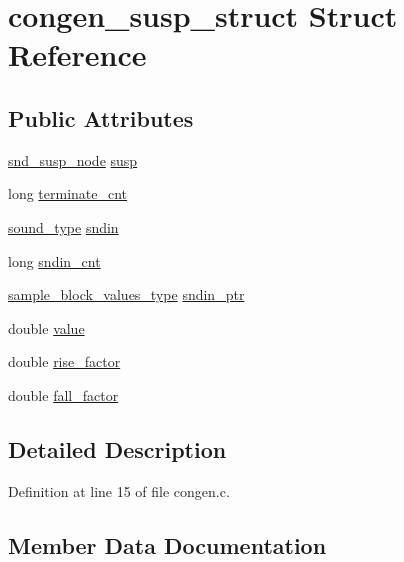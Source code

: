 \hypertarget{structcongen__susp__struct}{}\section{congen\+\_\+susp\+\_\+struct Struct Reference}
\label{structcongen__susp__struct}
\subsection*{Public Attributes}
\begin{DoxyCompactItemize}
\item 
\hyperlink{sound_8h_a6b268203688a934bd798ceb55f85d4c0}{snd\+\_\+susp\+\_\+node} \hyperlink{structcongen__susp__struct_a7e68a3f2f7cfc04521c251e8aa63b473}{susp}
\item 
long \hyperlink{structcongen__susp__struct_a2befa070198694684a16cc5afec63709}{terminate\+\_\+cnt}
\item 
\hyperlink{sound_8h_a792cec4ed9d6d636d342d9365ba265ea}{sound\+\_\+type} \hyperlink{structcongen__susp__struct_ad8e9b41cb4564279660b1e9a0158302e}{sndin}
\item 
long \hyperlink{structcongen__susp__struct_a3d70594810a32a1853aedff21ff5da29}{sndin\+\_\+cnt}
\item 
\hyperlink{sound_8h_a83d17f7b465d1591f27cd28fc5eb8a03}{sample\+\_\+block\+\_\+values\+\_\+type} \hyperlink{structcongen__susp__struct_a8dc2980de5478154eee6e74e2af624a4}{sndin\+\_\+ptr}
\item 
double \hyperlink{structcongen__susp__struct_a8c76f6e27d57a8bf69e1b863bd64a7c5}{value}
\item 
double \hyperlink{structcongen__susp__struct_a383e756dc161fc7ce8fac66bae34ee4c}{rise\+\_\+factor}
\item 
double \hyperlink{structcongen__susp__struct_adbf4aa6a367202a8ab6aa1a9c131e64d}{fall\+\_\+factor}
\end{DoxyCompactItemize}


\subsection{Detailed Description}


Definition at line 15 of file congen.\+c.



\subsection{Member Data Documentation}
